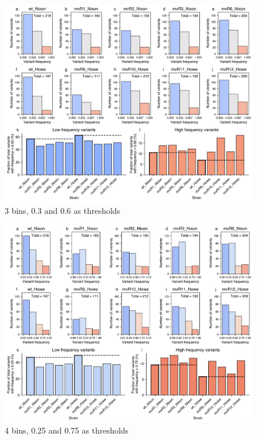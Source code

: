 \documentclass[12pt]{article}
\begin{document}
\begin{figure}[H]
    \centering
    \includegraphics[width=\hsize]{../Figures/WGS/variant_frequency_fraction_comparison_3bins.png}
    \caption{3 bins, 0.3 and 0.6 as thresholds}
    \label{fig:3bins}
\end{figure}

\begin{figure}[H]
    \centering
    \includegraphics[width=\hsize]{../Figures/WGS/variant_frequency_fraction_comparison_4bins.png}
    \caption{4 bins, 0.25 and 0.75 as thresholds}
    \label{fig:4bins}
\end{figure}
\end{document}
